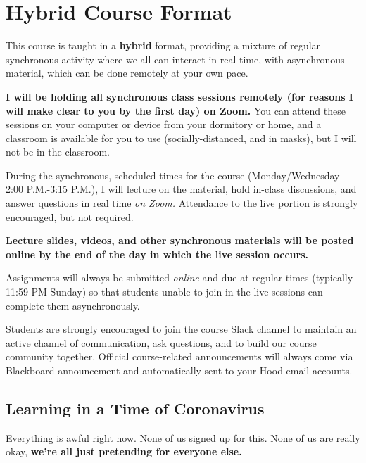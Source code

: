 \documentclass{article}
\begin{document}
\hypertarget{hybrid-course-format}{%
\section*{Hybrid Course Format}\label{hybrid-course-format}}

This course is taught in a \textbf{hybrid} format, providing a mixture
of regular synchronous activity where we all can interact in real time,
with asynchronous material, which can be done remotely at your own pace.

\textbf{I will be holding all synchronous class sessions remotely (for
reasons I will make clear to you by the first day) on Zoom.} You can
attend these sessions on your computer or device from your dormitory or
home, and a classroom is available for you to use (socially-distanced,
and in masks), but I will not be in the classroom.

During the synchronous, scheduled times for the course (Monday/Wednesday
2:00 P.M.-3:15 P.M.), I will lecture on the material, hold in-class
discussions, and answer questions in real time \emph{on Zoom.}
Attendance to the live portion is strongly encouraged, but not required.

\textbf{Lecture slides, videos, and other synchronous materials will be
posted online by the end of the day in which the live session occurs.}

Assignments will always be submitted \emph{online} and due at regular
times (typically 11:59 PM Sunday) so that students unable to join in the
live sessions can complete them asynchronously.

Students are strongly encouraged to join the course
\href{https://hoodcollegeeconomics.slack.com}{Slack channel} to maintain
an active channel of communication, ask questions, and to build our
course community together. Official course-related announcements will
always come via Blackboard announcement and automatically sent to your
Hood email accounts.

\hypertarget{learning-in-a-time-of-coronavirus}{%
\subsection*{Learning in a Time of
Coronavirus}\label{learning-in-a-time-of-coronavirus}}

Everything is awful right now. None of us signed up for this. None of us
are really okay, \textbf{we're all just pretending for everyone else.}
\end{document}
